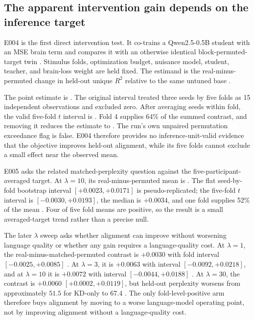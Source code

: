 \subsection{The apparent intervention gain depends on the inference target}
\label{sec:results-inference}

E004 is the first direct intervention test.
It co-trains a Qwen2.5-0.5B student with an MSE brain term and compares it with an otherwise identical block-permuted-target twin .
Stimulus folds, optimization budget, nuisance model, student, teacher, and brain-loss weight are held fixed.
The estimand is the real-minus-permuted change in held-out unique $R^2$ relative to the same untuned base .

The point estimate is .
The original interval treated three seeds by five folds as 15 independent observations and excluded zero.
After averaging seeds within fold, the valid five-fold $t$ interval is  .
Fold 4 supplies 64\% of the summed contrast, and removing it reduces the estimate to .
The run's own unpaired permutation exceedance flag is false.
E004 therefore provides no inference-unit-valid evidence that the objective improves held-out alignment, while its five folds cannot exclude a small effect near the observed mean.

E005 asks the related matched-perplexity question against the five-participant-averaged target.
At $\lambda=10$, its real-minus-permuted mean is .
The flat seed-by-fold bootstrap interval $[+0.0023,+0.0171]$ is pseudo-replicated; the five-fold $t$ interval is $[-0.0030,+0.0193]$, the median is $+0.0034$, and one fold supplies 52\% of the mean .
Four of five fold means are positive, so the result is a small averaged-target trend rather than a precise null.

The later $\lambda$ sweep asks whether alignment can improve without worsening language quality or whether any gain requires a language-quality cost.
At $\lambda=1$, the real-minus-matched-permuted contrast is $+0.0030$ with fold interval $[-0.0025,+0.0085]$ .
At $\lambda=3$, it is $+0.0063$ with interval $[-0.0092,+0.0218]$, and at $\lambda=10$ it is $+0.0072$ with interval $[-0.0044,+0.0188]$ .
At $\lambda=30$, the contrast is $+0.0060$ $[+0.0002,+0.0119]$, but held-out perplexity worsens from approximately $51.5$ for KD-only to $67.4$ .
The only fold-level-positive arm therefore buys alignment by moving to a worse language-model operating point, not by improving alignment without a language-quality cost.

